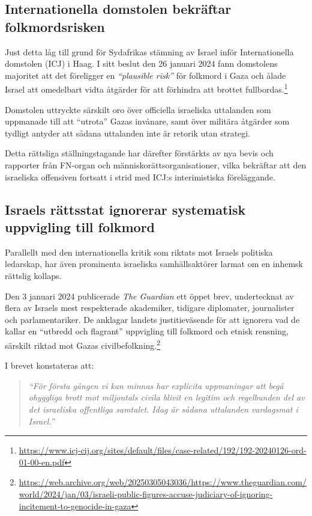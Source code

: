 \subsection{Internationella domstolen bekräftar folkmordsrisken}

Just detta låg till grund för Sydafrikas stämning av Israel inför Internationella domstolen (ICJ) i Haag. I sitt beslut den 26 januari 2024 fann domstolens majoritet att det föreligger en \textit{“plausible risk”} för folkmord i Gaza och ålade Israel att omedelbart vidta åtgärder för att förhindra att brottet fullbordas.\footnote{\url{https://www.icj-cij.org/sites/default/files/case-related/192/192-20240126-ord-01-00-en.pdf}}

Domstolen uttryckte särskilt oro över officiella israeliska uttalanden som uppmanade till att “utrota” Gazas invånare, samt över militära åtgärder som tydligt antyder att sådana uttalanden inte är retorik utan strategi.

Detta rättsliga ställningstagande har därefter förstärkts av nya bevis och rapporter från FN-organ och människorättsorganisationer, vilka bekräftar att den israeliska offensiven fortsatt i strid med ICJ:s interimistiska föreläggande.

\subsection{Israels rättsstat ignorerar systematisk uppvigling till folkmord}

Parallellt med den internationella kritik som riktats mot Israels politiska ledarskap, har även prominenta israeliska samhällsaktörer larmat om en inhemsk rättslig kollaps.

Den 3 januari 2024 publicerade \textit{The Guardian} ett öppet brev, undertecknat av flera av Israels mest respekterade akademiker, tidigare diplomater, journalister och parlamentariker. De anklagar landets justitieväsende för att ignorera vad de kallar en “utbredd och flagrant” uppvigling till folkmord och etnisk rensning, särskilt riktad mot Gazas civilbefolkning.\footnote{\url{https://web.archive.org/web/20250305043036/https://www.theguardian.com/world/2024/jan/03/israeli-public-figures-accuse-judiciary-of-ignoring-incitement-to-genocide-in-gaza}}

I brevet konstateras att:
\begin{quote}
\textit{“För första gången vi kan minnas har explicita uppmaningar att begå ohyggliga brott mot miljontals civila blivit en legitim och regelbunden del av det israeliska offentliga samtalet. Idag är sådana uttalanden vardagsmat i Israel.”}
\end{quote}

